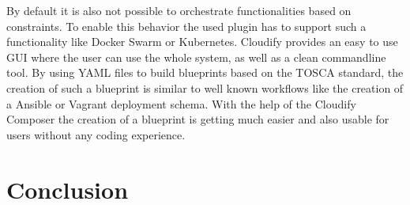 By default it is also not possible to orchestrate functionalities based on constraints.
To enable this behavior the used plugin has to support such a functionality like Docker Swarm or Kubernetes.
Cloudify provides an easy to use \ac{GUI} where the user can use the whole system, as well as a clean commandline tool.
By using \ac{YAML} files to build blueprints based on the \ac{TOSCA} standard, the creation of such a blueprint is similar to well known workflows like the creation of a Ansible or Vagrant deployment schema.
With the help of the Cloudify Composer the creation of a blueprint is getting much easier and also usable for users without any coding experience.



\section{Conclusion}
\label{section:requirements-conclusion}
\doit

